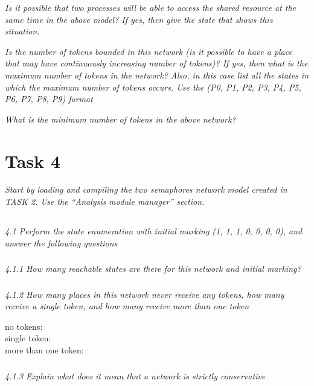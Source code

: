 \documentclass[letterpaper]{article}
\begin{document}
\textit{Is it possible that two processes will be able to access the shared resource at the same time in the above model? If yes, then give the state that shows this situation.}

\vspace{2cm}
\textit{Is the number of tokens bounded in this network (is it possible to have a place that may have continuously increasing number of tokens)? If yes, then what is the maximum number of tokens in the network? Also, in this case list all the states in which the maximum number of tokens occurs.
 Use the (P0, P1, P2, P3, P4, P5, P6, P7, P8, P9) format
}


\vspace{1cm}
\textit{What is the minimum number of tokens in the above network?}

\section{Task 4}

\textit{Start by loading and compiling the two semaphores network model created in TASK 2. Use the “Analysis module manager” section.}

\subsection{}
\textit{ 4.1  Perform the state enumeration with initial marking (1, 1, 1, 0, 0, 0, 0), and answer the following questions}

\subsubsection{}
\textit{ 4.1.1  How many reachable states are there for this network and initial marking?}

\subsubsection{}
\textit{ 4.1.2  How many places in this network never receive any tokens, how many receive a single token, and how many receive more than one token}

no tokens: \\
single token: \\
more than one token: \\

\subsubsection{}
\textit{ 4.1.3  Explain what does it mean that a network is strictly conservative}
\end{document}
